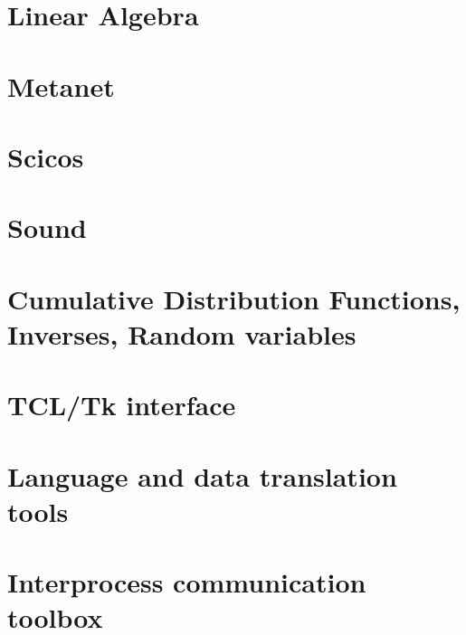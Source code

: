 \chapter{Linear Algebra}
\setcounter{section}{1}\setcounter{subsection}{0}
        
\chapter{Metanet}
\setcounter{section}{1}\setcounter{subsection}{0}
        
\chapter{Scicos} 
        
\chapter{Sound}
 \setcounter{section}{1}\setcounter{subsection}{0}
        
\chapter{Cumulative Distribution Functions, Inverses, Random
        variables}
\setcounter{section}{1}\setcounter{subsection}{0}
        
\chapter{TCL/Tk interface}
\setcounter{section}{1}\setcounter{subsection}{0}
        
\chapter{Language and data translation tools}
\setcounter{section}{1}\setcounter{subsection}{0}
        
\chapter{Interprocess communication toolbox}
\setcounter{section}{1}\setcounter{subsection}{0}
        
\printindex

